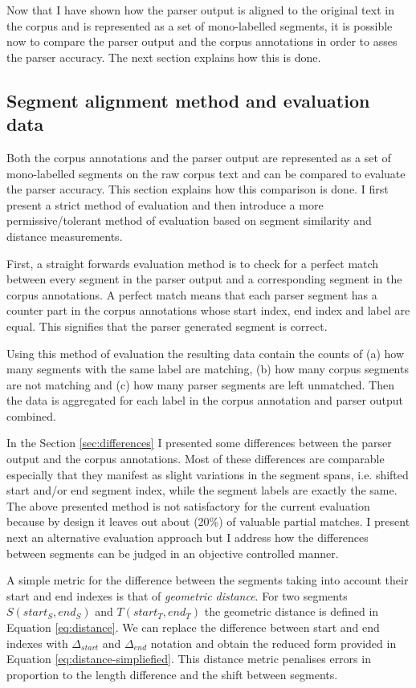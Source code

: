     Now that I have shown how the parser output is aligned to the original text in the corpus and is represented as a set of mono-labelled segments, it is possible now to compare the parser output and the corpus annotations in order to asses the parser accuracy. The next section explains how this is done. 

\subsection{Segment alignment method and evaluation data}
\label{sec:alignment-algorithms}    

    Both the corpus annotations and the parser output are represented as a set of mono-labelled segments on the raw corpus text and can be compared to evaluate the parser accuracy. This section explains how this comparison is done. I first present a strict method of evaluation and then introduce a more permissive/tolerant  method of evaluation based on segment similarity and distance measurements. 

    First, a straight forwards evaluation method is to check for a perfect match between every segment in the parser output and a corresponding segment in the corpus annotations. A perfect match means that each parser segment has a counter part in the corpus annotations whose start index, end index and label are equal. This signifies that the parser generated segment is correct.
    
    Using this method of evaluation the resulting data contain the counts of (a) how many segments with the same label are matching, (b) how many corpus segments are not matching and (c) how many parser segments are left unmatched. Then the data is aggregated for each label in the corpus annotation and parser output combined. 
    
    In the Section \ref{sec:differences} I presented some differences between the parser output and the corpus annotations. Most of these differences are comparable especially that they manifest as slight variations in the segment spans, i.e. shifted start and/or end segment index, while the segment labels are exactly the same. The above presented method is not satisfactory for the current evaluation because by design it leaves out about (20\%) of valuable partial matches. I present next an alternative evaluation approach but I address how the differences between segments can be judged in an objective  controlled manner.
    
    A simple metric for the difference between the segments taking into account their start and end indexes is that of \textit{geometric distance}. For two segments $S(start_S,end_S)$ and $T(start_T,end_T)$ the geometric distance is defined in Equation \ref{eq:distance}. We can replace the difference between start and end indexes with $\varDelta_{start}$ and $\varDelta_{end}$ notation and obtain the reduced form provided in Equation \ref{eq:distance-simpliefied}. This distance metric penalises errors in proportion to the length difference and the shift between segments. 
    
